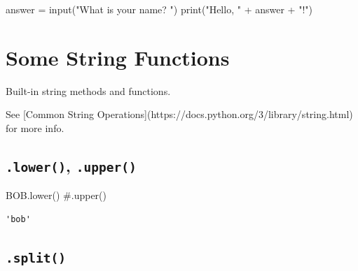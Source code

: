 \documentclass[
  letterpaper,
  DIV=11,
  numbers=noendperiod]{scrreprt}
\newenvironment{Shaded}{\begin{snugshade}}{\end{snugshade}}
\newcommand{\BuiltInTok}[1]{\textcolor[rgb]{0.00,0.23,0.31}{#1}}
\newcommand{\CommentTok}[1]{\textcolor[rgb]{0.37,0.37,0.37}{#1}}
\newcommand{\ControlFlowTok}[1]{\textcolor[rgb]{0.00,0.23,0.31}{#1}}
\newcommand{\DecValTok}[1]{\textcolor[rgb]{0.68,0.00,0.00}{#1}}
\newcommand{\KeywordTok}[1]{\textcolor[rgb]{0.00,0.23,0.31}{#1}}
\newcommand{\NormalTok}[1]{\textcolor[rgb]{0.00,0.23,0.31}{#1}}
\newcommand{\OperatorTok}[1]{\textcolor[rgb]{0.37,0.37,0.37}{#1}}
\newcommand{\StringTok}[1]{\textcolor[rgb]{0.13,0.47,0.30}{#1}}
\begin{document}
\begin{Shaded}
\begin{Highlighting}[]
\NormalTok{answer }\OperatorTok{=} \BuiltInTok{input}\NormalTok{(}\StringTok{"What is your name? "}\NormalTok{)}
\BuiltInTok{print}\NormalTok{(}\StringTok{"Hello, "} \OperatorTok{+}\NormalTok{ answer }\OperatorTok{+} \StringTok{"!"}\NormalTok{)}
\end{Highlighting}
\end{Shaded}

\hypertarget{some-string-functions}{%
\chapter{Some String Functions}\label{some-string-functions}}

\begin{Shaded}
\begin{Highlighting}[]
\NormalTok{Built}\OperatorTok{{-}}\KeywordTok{in}\NormalTok{ string methods }\KeywordTok{and}\NormalTok{ functions.}

\NormalTok{See [Common String Operations](https:}\OperatorTok{//}\NormalTok{docs.python.org}\OperatorTok{/}\DecValTok{3}\OperatorTok{/}\NormalTok{library}\OperatorTok{/}\NormalTok{string.html) }\ControlFlowTok{for}\NormalTok{ more info.}
\end{Highlighting}
\end{Shaded}

\hypertarget{lower-.upper}{%
\section{\texorpdfstring{\texttt{.lower()},
\texttt{.upper()}}{.lower(), .upper()}}\label{lower-.upper}}

\begin{Shaded}
\begin{Highlighting}[]
\CommentTok{\textquotesingle{}BOB\textquotesingle{}}\NormalTok{.lower() }\CommentTok{\#.upper()}
\end{Highlighting}
\end{Shaded}

\begin{verbatim}
'bob'
\end{verbatim}

\hypertarget{split}{%
\section{\texorpdfstring{\texttt{.split()}}{.split()}}\label{split}}
\end{document}
